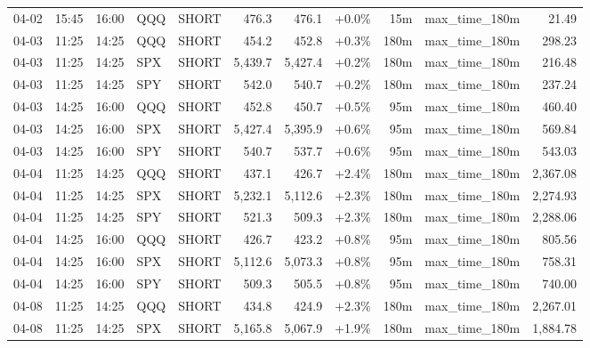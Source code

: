 \documentclass[11pt,a4paper,twoside]{article}
\begin{document}
\begin{center}
\begin{longtable}{>{\color{txtmain}}l l l l l r r r r >{\color{txtmain}}l r}
04-02 & 15:45 & 16:00 & QQQ & SHORT & 476.3 & 476.1 & \textcolor{wingreen}{+0.0\%} & 15m & max\_time\_180m & \textcolor{wingreen}{21.49} \\
04-03 & 11:25 & 14:25 & QQQ & SHORT & 454.2 & 452.8 & \textcolor{wingreen}{+0.3\%} & 180m & max\_time\_180m & \textcolor{wingreen}{298.23} \\
04-03 & 11:25 & 14:25 & SPX & SHORT & 5,439.7 & 5,427.4 & \textcolor{wingreen}{+0.2\%} & 180m & max\_time\_180m & \textcolor{wingreen}{216.48} \\
04-03 & 11:25 & 14:25 & SPY & SHORT & 542.0 & 540.7 & \textcolor{wingreen}{+0.2\%} & 180m & max\_time\_180m & \textcolor{wingreen}{237.24} \\
04-03 & 14:25 & 16:00 & QQQ & SHORT & 452.8 & 450.7 & \textcolor{wingreen}{+0.5\%} & 95m & max\_time\_180m & \textcolor{wingreen}{460.40} \\
04-03 & 14:25 & 16:00 & SPX & SHORT & 5,427.4 & 5,395.9 & \textcolor{wingreen}{+0.6\%} & 95m & max\_time\_180m & \textcolor{wingreen}{569.84} \\
04-03 & 14:25 & 16:00 & SPY & SHORT & 540.7 & 537.7 & \textcolor{wingreen}{+0.6\%} & 95m & max\_time\_180m & \textcolor{wingreen}{543.03} \\
04-04 & 11:25 & 14:25 & QQQ & SHORT & 437.1 & 426.7 & \textcolor{wingreen}{+2.4\%} & 180m & max\_time\_180m & \textcolor{wingreen}{2,367.08} \\
04-04 & 11:25 & 14:25 & SPX & SHORT & 5,232.1 & 5,112.6 & \textcolor{wingreen}{+2.3\%} & 180m & max\_time\_180m & \textcolor{wingreen}{2,274.93} \\
04-04 & 11:25 & 14:25 & SPY & SHORT & 521.3 & 509.3 & \textcolor{wingreen}{+2.3\%} & 180m & max\_time\_180m & \textcolor{wingreen}{2,288.06} \\
04-04 & 14:25 & 16:00 & QQQ & SHORT & 426.7 & 423.2 & \textcolor{wingreen}{+0.8\%} & 95m & max\_time\_180m & \textcolor{wingreen}{805.56} \\
04-04 & 14:25 & 16:00 & SPX & SHORT & 5,112.6 & 5,073.3 & \textcolor{wingreen}{+0.8\%} & 95m & max\_time\_180m & \textcolor{wingreen}{758.31} \\
04-04 & 14:25 & 16:00 & SPY & SHORT & 509.3 & 505.5 & \textcolor{wingreen}{+0.8\%} & 95m & max\_time\_180m & \textcolor{wingreen}{740.00} \\
04-08 & 11:25 & 14:25 & QQQ & SHORT & 434.8 & 424.9 & \textcolor{wingreen}{+2.3\%} & 180m & max\_time\_180m & \textcolor{wingreen}{2,267.01} \\
04-08 & 11:25 & 14:25 & SPX & SHORT & 5,165.8 & 5,067.9 & \textcolor{wingreen}{+1.9\%} & 180m & max\_time\_180m & \textcolor{wingreen}{1,884.78} \\

\end{longtable}
\end{center}
\end{document}
